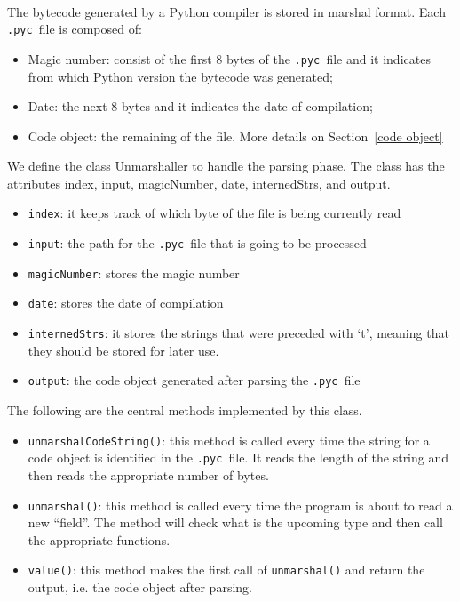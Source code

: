 \documentclass{article}
\newcommand{\pyc}{\texttt{.pyc~}}
\begin{document}
\paragraph{}
The bytecode generated by a Python compiler is stored in marshal format. Each \pyc file is composed of:

\begin{itemize}
	\item Magic number: consist of the first 8 bytes of the \pyc file and it indicates from which Python version the bytecode was generated;
	\item Date: the next 8 bytes and it indicates the date of compilation;
	\item Code object: the remaining of the file. More details on Section~\ref{code object}
\end{itemize}

We define the class Unmarshaller to handle the parsing phase. The class has the attributes index, input, magicNumber, date, internedStrs, and output.

\begin{itemize}
	\item \texttt{index}: it keeps track of which byte of the file is being currently read 
	\item \texttt{input}: the path for the \pyc file that is going to be processed
	\item \texttt{magicNumber}: stores the magic number
	\item \texttt{date}: stores the date of compilation
	\item \texttt{internedStrs}: it stores the strings that were preceded with `t', meaning that they should be stored for later use.
	\item \texttt{output}: the code object generated after parsing the \pyc file
\end{itemize}

The following are the central methods implemented by this class.

\begin{itemize}
	\item \texttt{unmarshalCodeString()}:  this method is called every time the string for a code object is identified in the \pyc file. It reads the length of the string and then reads the appropriate number of bytes.
	\item \texttt{unmarshal()}: this method is called every time the program is about to read a new ``field''. The method will check what is the upcoming type and then call the appropriate functions.
	\item \texttt{value()}: this method makes the first call of \texttt{unmarshal()} and return the output, i.e. the code object after parsing.
\end{itemize}
\end{document}
